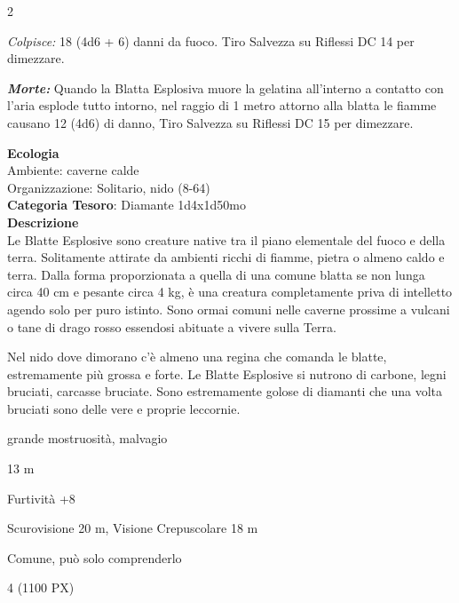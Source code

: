 \begin{multicols}{2}
{\emph{Colpisce:} 18 (4d6 + 6) danni da fuoco. Tiro Salvezza su Riflessi DC 14 per dimezzare.

\emph{\textbf{Morte:}} Quando la Blatta Esplosiva muore la gelatina all'interno a contatto con l'aria esplode tutto intorno, nel raggio di 1 metro attorno alla blatta le fiamme causano 12 (4d6) di danno, Tiro Salvezza su Riflessi DC 15 per dimezzare.

\textbf{Ecologia}\\
Ambiente: caverne calde\\
Organizzazione: Solitario, nido (8-64)\\
\textbf{Categoria Tesoro}: Diamante 1d4x1d50mo\\
\textbf{Descrizione}\\
Le Blatte Esplosive sono creature native tra il piano elementale del fuoco e della terra. Solitamente attirate da ambienti ricchi di fiamme, pietra o almeno caldo e terra.
Dalla forma proporzionata a quella di una comune blatta se non lunga circa 40 cm e pesante circa 4 kg, è una creatura completamente priva di intelletto agendo solo per puro istinto.
Sono ormai comuni nelle caverne prossime a vulcani o tane di drago rosso essendosi abituate a vivere sulla Terra.

Nel nido dove dimorano c'è almeno una regina che comanda le blatte, estremamente più grossa e forte. Le Blatte Esplosive si nutrono di carbone, legni bruciati, carcasse bruciate. Sono estremamente golose di diamanti che una volta bruciati sono delle vere e proprie leccornie.

\begin{description}[noitemsep, topsep=0pt, parsep=0pt, partopsep=0pt, itemsep=1pt, leftmargin=2.35cm,  labelwidth=2.2cm, itemindent=0cm, listparindent=0pt] %
\setlength{\baselineskip}{10pt}
\item[\textbf{Taglia/Tipo}] grande mostruosità, malvagio
\item[\textbf{Caratt.}] 
\item[\textbf{Punti Ferita}] 
\item[\textbf{Movimento}] 13 m
\item[\textbf{Tiri Salvez.}] 
\item[\textbf{Comp.}] Furtività +8
\item[\textbf{Sensi}] Scurovisione 20 m, Visione Crepuscolare 18 m
\item[\textbf{Linguaggi}] Comune, può solo comprenderlo
\item[\textbf{Sfida}] 4 (1100 PX)
\end{description}
\smallskip

}
\end{multicols}
